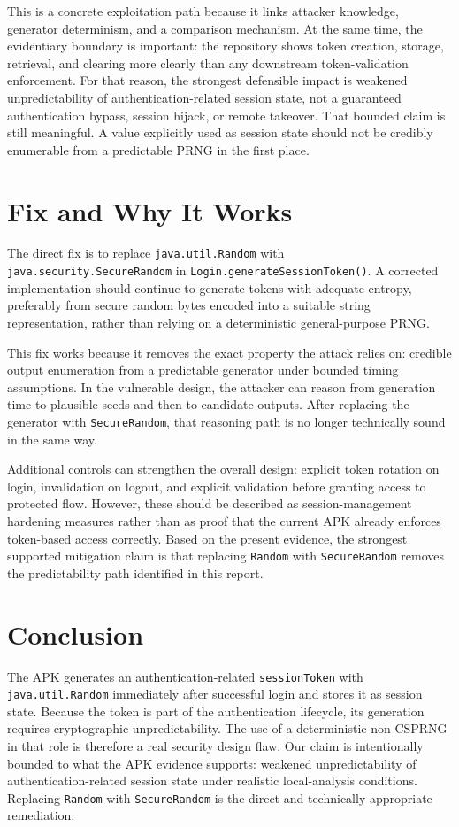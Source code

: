 \documentclass[letterpaper,twocolumn,10pt]{article}
\begin{document}
This is a concrete exploitation path because it links attacker knowledge, generator determinism, and a comparison mechanism. At the same time, the evidentiary boundary is important: the repository shows token creation, storage, retrieval, and clearing more clearly than any downstream token-validation enforcement. For that reason, the strongest defensible impact is weakened unpredictability of authentication-related session state, not a guaranteed authentication bypass, session hijack, or remote takeover. That bounded claim is still meaningful. A value explicitly used as session state should not be credibly enumerable from a predictable PRNG in the first place.

\section{Fix and Why It Works}
The direct fix is to replace \texttt{java.util.Random} with \texttt{java.security.SecureRandom} in \texttt{Login.generateSessionToken()}. A corrected implementation should continue to generate tokens with adequate entropy, preferably from secure random bytes encoded into a suitable string representation, rather than relying on a deterministic general-purpose PRNG.

This fix works because it removes the exact property the attack relies on: credible output enumeration from a predictable generator under bounded timing assumptions. In the vulnerable design, the attacker can reason from generation time to plausible seeds and then to candidate outputs. After replacing the generator with \texttt{SecureRandom}, that reasoning path is no longer technically sound in the same way.

Additional controls can strengthen the overall design: explicit token rotation on login, invalidation on logout, and explicit validation before granting access to protected flow. However, these should be described as session-management hardening measures rather than as proof that the current APK already enforces token-based access correctly. Based on the present evidence, the strongest supported mitigation claim is that replacing \texttt{Random} with \texttt{SecureRandom} removes the predictability path identified in this report.

\section{Conclusion}
The APK generates an authentication-related \texttt{sessionToken} with \texttt{java.util.Random} immediately after successful login and stores it as session state. Because the token is part of the authentication lifecycle, its generation requires cryptographic unpredictability. The use of a deterministic non-CSPRNG in that role is therefore a real security design flaw. Our claim is intentionally bounded to what the APK evidence supports: weakened unpredictability of authentication-related session state under realistic local-analysis conditions. Replacing \texttt{Random} with \texttt{SecureRandom} is the direct and technically appropriate remediation.
\end{document}
